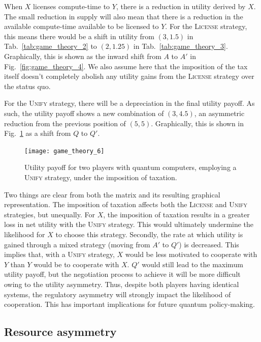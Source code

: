 When $X$ licenses compute-time to $Y$, there is a reduction in utility derived by $X$. The small reduction in supply will also mean that there is a reduction in the available compute-time available to be licensed to $Y$. For the \textsc{License} strategy, this means there would be a shift in utility from $(3,1.5)$ in Tab.~\ref{tab:game_theory_2} to $(2, 1.25)$ in Tab.~\ref{tab:game_theory_3}. Graphically, this is shown as the inward shift from $A$ to $A'$ in Fig.~\ref{fig:game_theory_4}. We also assume here that the imposition of the tax itself doesn't completely abolish any utility gains from the \textsc{License} strategy over the status quo.

For the \textsc{Unify} strategy, there will be a depreciation in the final utility payoff. As such, the utility payoff shows a new combination of $(3,4.5)$, an asymmetric reduction from the previous position of $(5,5)$. Graphically, this is shown in Fig.~\ref{fig:game_theory_6} as a shift from $Q$ to $Q'$.

\begin{figure}[!htbp]
\texttt{[image: game\_theory\_6]}
\captionspacefig \caption{Utility payoff for two players with quantum computers, employing a \textsc{Unify} strategy, under the imposition of taxation.}\label{fig:game_theory_6}
\end{figure}

Two things are clear from both the matrix and its resulting graphical representation. The imposition of taxation affects both the \textsc{License} and \textsc{Unify} strategies, but unequally. For $X$, the imposition of taxation results in a greater loss in net utility with the \textsc{Unify} strategy. This would ultimately undermine the likelihood for $X$ to choose this strategy. Secondly, the rate at which utility is gained through a mixed strategy (moving from $A'$ to $Q'$) is decreased. This implies that, with a \textsc{Unify} strategy, $X$ would be less motivated to cooperate with $Y$ than $Y$ would be to cooperate with $X$. $Q'$ would still lead to the maximum utility payoff, but the negotiation process to achieve it will be more difficult owing to the utility asymmetry. Thus, despite both players having identical systems, the regulatory asymmetry will strongly impact the likelihood of cooperation. This has important implications for future quantum policy-making.

\subsection{Resource asymmetry}

